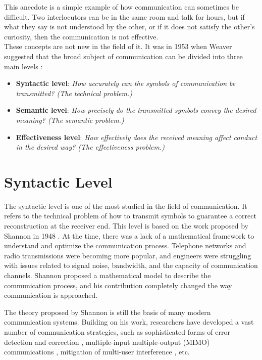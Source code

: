 This anecdote is a simple example of how communication can sometimes be difficult. Two interlocutors can be in the same room and talk for hours, but if what they say is not understood by the other, or if it does not satisfy the other's curiosity, then the communication is not effective.\\
These concepts are not new in the field of \gls{it}.  It was in 1953 when Weaver suggested that the broad subject of communication can be divided into three main levels \cite{WARREN1953semantic}:
\begin{itemize}[{label={--}}]
    \item \textbf{Syntactic level}: \textit{How accurately can the symbols of communication be transmitted? (The technical problem.)}
    \item \textbf{Semantic level}: \textit{How precisely do the transmitted symbols convey the desired meaning? (The semantic problem.)}
    \item \textbf{Effectiveness level}: \textit{How effectively does the received meaning affect conduct in the desired way? (The effectiveness problem.)}
\end{itemize}

\section{Syntactic Level}
The syntactic level is one of the most studied in the field of communication. It refers to the technical problem of how to transmit symbols to guarantee a correct reconstruction at the receiver end. This level is based on the work proposed by Shannon in 1948 \cite{Shannon1948Communication}. At the time, there was a lack of a mathematical framework to understand and optimize the communication process. Telephone networks and radio transmissions were becoming more popular, and engineers were struggling with issues related to signal noise, bandwidth, and the capacity of communication channels. Shannon proposed a mathematical model to describe the communication process, and his contribution completely changed the way communication is approached.

The theory proposed by Shannon is still the basis of many modern communication systems. Building on his work, researchers have developed a vast number of communication strategies, such as sophisticated forms of error detection and correction \cite{Mercier2010errorcorrection}, multiple-input multiple-output (MIMO) communications \cite{Jensen2016MIMO}, mitigation of multi-user interference \cite{Yang2022interference}, etc.

